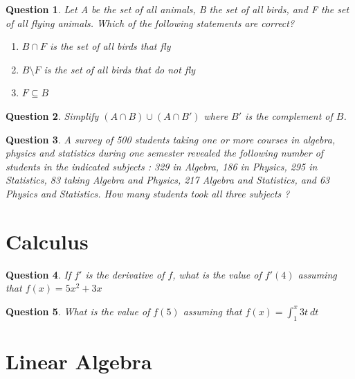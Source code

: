 \documentclass[13pt,a4paper]{article}
\newtheorem{question}{Question}
\begin{document}
\begin{question}
Let A be the set of all animals, B the set of all birds, and F the set of all flying animals.  Which of the following statements are correct?
\begin{enumerate}
\item 
$B \cap F$ is the set of all birds that fly
\item
$B \setminus F$ is the set of all birds that do not fly
\item
$F \subseteq B$ 
\end{enumerate}
\end{question}


\begin{question}
Simplify $(A \cap B) \cup (A \cap B')$ where $B'$ is the complement of $B$.
\end{question}



\begin{question}
A survey of 500 students taking one or more courses in algebra, physics and statistics during one semester revealed
the following number of students in the indicated subjects : 
329 in Algebra, 186 in Physics, 295 in Statistics, 83 taking Algebra and Physics, 217 Algebra and Statistics, and 63 Physics and Statistics.
How many students took all three subjects ? 
\end{question}


\section{Calculus}

\begin{question}
If $f'$ is the derivative of $f$, what is the value of $f'(4)$ assuming that 
$f(x) = 5x^2 +3x$ 
\end{question}

\begin{question}
What is the value of $f(5) $ assuming that $f(x) = \int_1^x 3t ~dt$ 
\end{question}


\section{Linear Algebra}

\end{document}

